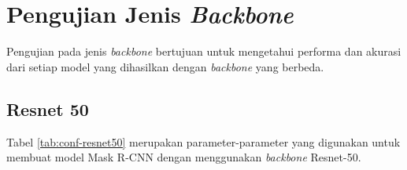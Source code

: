 \section{Pengujian Jenis \textit{Backbone}}
\label{sec:pengujian-backbone}

Pengujian pada jenis \textit{backbone} bertujuan untuk mengetahui performa dan akurasi dari setiap model yang dihasilkan dengan \textit{backbone} yang berbeda.

\subsection{Resnet 50}
\label{subsec:resnet50}

Tabel \ref{tab:conf-resnet50} merupakan parameter-parameter yang digunakan untuk membuat model Mask R-CNN dengan menggunakan \textit{backbone} Resnet-50.


